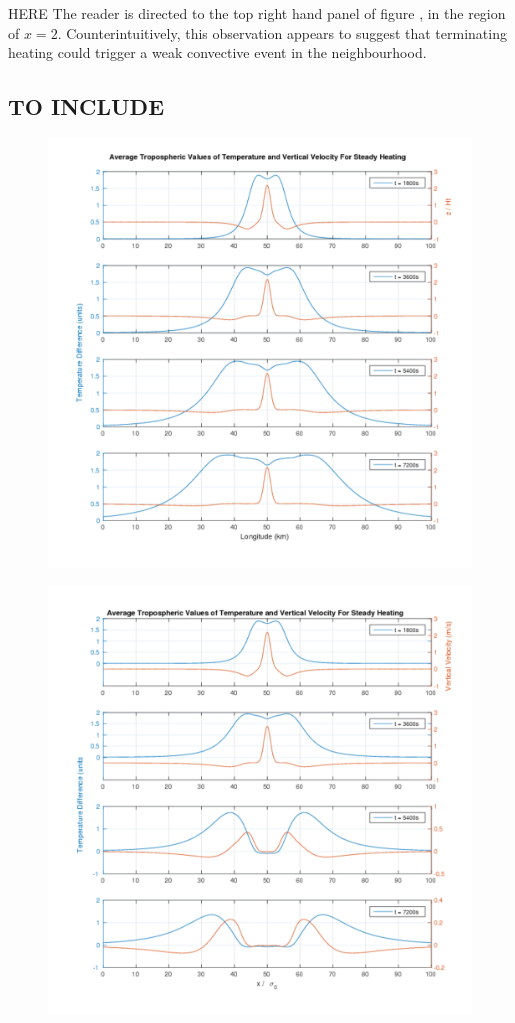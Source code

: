 \documentclass[a4paper,10pt]{article}
\begin{document}


HERE The reader is directed to the top right hand panel of
figure , in the region of $x = 2$. Counterintuitively, this observation appears to suggest that
terminating heating could trigger a weak convective event in the neighbourhood.


\subsection{TO INCLUDE}
\begin{figure}
  \caption{}
  \centering
    \includegraphics[width=1\textwidth]{trop_values_steady.pdf}
  \label{trop_values_steady}
\end{figure}

\begin{figure}
  \caption{}
  \centering
    \includegraphics[width=1\textwidth]{trop_values_transient.pdf}
  \label{trop_values_transient}
\end{figure}
\end{document}
